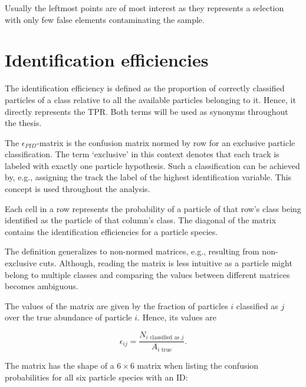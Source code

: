 Usually the leftmost points are of most interest as they represents a selection with only few false elements contaminating the sample.

\section{Identification efficiencies}
\label{sec:efficiency}

The identification efficiency is defined as the proportion of correctly classified particles of a class relative to all the available particles belonging to it. Hence, it directly represents the TPR. Both terms will be used as synonyms throughout the thesis.

The $\epsilon_{PID}$-matrix is the confusion matrix normed by row for an exclusive particle classification. The term `exclusive' in this context denotes that each track is labeled with exactly one particle hypothesis. Such a classification can be achieved by, e.g., assigning the track the label of the highest identification variable. This concept is used throughout the analysis.

Each cell in a row represents the probability of a particle of that row's class being identified as the particle of that column's class. The diagonal of the matrix contains the identification efficiencies for a particle species.

The definition generalizes to non-normed matrices, e.g., resulting from non-exclusive cuts. Although, reading the matrix is less intuitive as a particle might belong to multiple classes and comparing the values between different matrices becomes ambiguous.

The values of the matrix are given by the fraction of particles $i$ classified as $j$ over the true abundance of particle $i$. Hence, its values are

\begin{equation}
	\epsilon_{i j} = \frac{N_{i \text{ classified as } j}}{A_{i \text{ true}}}.
\end{equation}

The matrix has the shape of a $6 \times 6$ matrix when listing the confusion probabilities for all six particle species with an ID:

